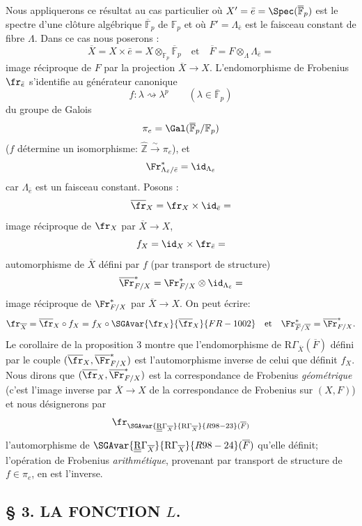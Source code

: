 Nous appliquerons ce résultat au cas particulier où $X'=\bar e=\Spec(\overline{\mathbb{F}}_p)$ est le spectre d'une clôture algébrique $\overline{\mathbb{F}}_p$ de $\mathbb{F}_p$ et où $F'=\Lambda_{\bar e}$ est le faisceau constant de fibre $\Lambda$. Dans ce cas nous poserons :
\[
\overline X=X\times\bar e=X\otimes_{\mathbb{F}_p}\overline{\mathbb{F}}_p\quad\text{et}\quad
\overline F=F\otimes_\Lambda\Lambda_{\bar e}=
\]
image réciproque de $F$ par la projection $\overline X\to X$. L'endomorphisme de Frobenius $\fr_{\bar e}$ s'identifie au générateur canonique
\[
f:\lambda\rightsquigarrow\lambda^p\qquad(\lambda\in\overline{\mathbb{F}}_p)
\]
du groupe de Galois
\[
\pi_e=\Gal(\overline{\mathbb{F}}_p/\mathbb{F}_p)
\]
($f$ détermine un isomorphisme: $\widehat{\mathbb{Z}}\xrightarrow{\sim}\pi_e$), et
\[
\Fr^*_{\Lambda_{\bar e}/\bar e}=\id_{\Lambda_{\bar e}}
\]
car $\Lambda_{\bar e}$ est un faisceau constant. Posons :
\[
\overline{\fr}_X=\fr_X\times\id_{\bar e}=
\]
image réciproque de $\fr_X$ par $\overline X\to X$,
\[
f_X=\id_X\times\fr_{\bar e}=
\]
automorphisme de $\overline X$ défini par $f$ (par transport de structure)
\[
\overline{\Fr}^*_{F/X}=\Fr^*_{F/X}\otimes\id_{\Lambda_{\bar e}}=
\]
image réciproque de $\Fr^*_{F/X}$ par $\overline X\to X$. On peut écrire:
\[
\fr_{\overline X}=\overline{\fr}_X\circ f_X=f_X\circ\SGAvar{\fr_X}{\overline{\fr}_X}{FR-1002}\quad\text{et}\quad
\Fr^*_{\overline F/\overline X}=\overline{\Fr}^*_{F/X}.
\]
Le corollaire de la proposition 3 montre que l'endomorphisme de $\mathrm{R}\Gamma_{\overline X}(\overline F)$ défini par le couple $(\overline{\fr}_X,\overline{\Fr}^*_{F/X})$ est l'automorphisme inverse de celui que définit $f_X$. Nous dirons que $(\overline{\fr}_X,\overline{\Fr}^*_{F/X})$ est la correspondance de Frobenius \emph{géométrique} (c'est l'image inverse par $\overline X\to X$ de la correspondance de Frobenius sur $(X,F)$) et nous désignerons par
\[
\fr_{\SGAvar{\underline{\underline{\mathrm{R}}}\Gamma_{\overline X}}{\mathrm{R}\Gamma_{\overline X}}{R98-23}(\overline F)}
\]
l'automorphisme de $\SGAvar{\underline{\underline{\mathrm{R}}}\Gamma_{\overline X}}{\mathrm{R}\Gamma_{\overline X}}{R98-24}(\overline F)$ qu'elle définit; l'opération de Frobenius \emph{arithmétique}, provenant par transport de structure de $f\in\pi_e$, en est l'inverse.

\subsection*{§ 3. LA FONCTION $L$.}

